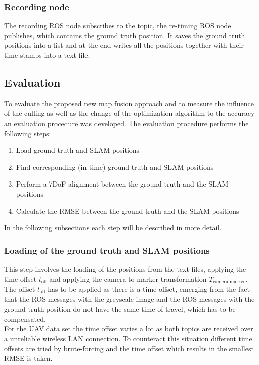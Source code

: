 \subsubsection{Recording node}
\label{subsubsec:record_node}
The recording \ac{ROS} node subscribes to the topic, the re-timing \ac{ROS} node publishes, which contains the ground truth position. It saves the ground truth positions into a list and at the end writes all the positions together with their time stamps into a text file.

\subsection{Evaluation}
To evaluate the proposed new map fusion approach and to measure the influence of the culling as well as the change of the optimization algorithm to the accuracy an evaluation procedure was developed. The evaluation procedure performs the following steps:

\begin{enumerate}
  \item Load ground truth and \ac{SLAM} positions
  \item Find corresponding (in time) ground truth and \ac{SLAM} positions
  \item Perform a 7DoF alignment between the ground truth and the \ac{SLAM} positions
  \item Calculate the \acf{RMSE} between the ground truth and the \ac{SLAM} positions
\end{enumerate}

In the following subsections each step will be described in more detail.

\subsubsection{Loading of the ground truth and \ac{SLAM} positions}
This step involves the loading of the positions from the text files, applying the time offset $t_{\text{off}}$ and applying the camera-to-marker transformation $T_{\text{camera\_marker}}$.\\

The offset $t_{\text{off}}$ has to be applied as there is a time offset, emerging from the fact that the \ac{ROS} messages with the greyscale image and the \ac{ROS} messages with the ground truth position do not have the same time of travel, which has to be compensated.\\
For the \ac{UAV} data set the time offset varies a lot as both topics are received over a unreliable wireless LAN connection. To counteract this situation different time offsets are tried by brute-forcing and the time offset which results in the smallest \ac{RMSE} is taken.\\ 


